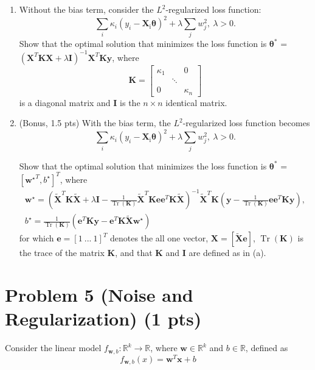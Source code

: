 \documentclass{article}
\DeclareMathOperator{\Tr}{Tr}
\def\matI{{\mathbf I}}
\def\matK{{\mathbf K}}
\begin{document}
\begin{enumerate}[label=(\alph*)]
\item Without the bias term, consider the $L^2$-regularized loss function:
$$\sum_i \kappa_i \left(y_i-\boldsymbol{X}_{\mathrm{i}} \boldsymbol{\theta}\right)^2+\lambda \sum_j w_j^2, \ \lambda > 0.$$
Show that the optimal solution that minimizes the loss function is $\boldsymbol{\theta^*}$ = $\left( \boldsymbol{X}^T \boldsymbol{K} \boldsymbol{X} + \lambda \boldsymbol{I}\right)^{-1} \boldsymbol{X}^T \boldsymbol{K} \boldsymbol{y}$, where
\begin{equation*}
  \boldsymbol{K} =
  \begin{bmatrix}
    \kappa_{1} & & 0\\
    & \ddots & \\
    0 & & \kappa_{n}
  \end{bmatrix}
\end{equation*}
%
is a diagonal matrix and $\boldsymbol{I}$ is the $n \times n$ identical matrix. 
%
\item (Bonus, 1.5 pts) With the bias term, the $L^2$-regularized loss function becomes
$$\sum_i \kappa_i \left(y_i-\boldsymbol{X}_{\mathrm{i}} \boldsymbol{\theta} \right)^2+\lambda \sum_j w_j^2, \ \lambda > 0.$$

Show that the optimal solution that minimizes the loss function is $\boldsymbol{\theta^*} $ =  $[ \boldsymbol{w^{\star}}^T, b^{\star}]^T$, where 
\begin{gather*}
\boldsymbol{w^{\star}}=\left( \boldsymbol{\tilde{X}}^T \boldsymbol{K} \boldsymbol{\tilde{X}} + \lambda \boldsymbol{I} - \frac{1}{\Tr{(\boldsymbol{K})}} \boldsymbol{\tilde{X}}^T \boldsymbol{K} \boldsymbol{e} \boldsymbol{e}^T \boldsymbol{K} \boldsymbol{\tilde{X}} \right)^{-1} \boldsymbol{\tilde{X}}^T \boldsymbol{K} \left( \boldsymbol{y} - \frac{1}{\Tr{(\boldsymbol{K})}} \boldsymbol{e} \boldsymbol{e}^T \boldsymbol{K} \boldsymbol{y} \right),\\
b^{\star} = \frac{1}{\Tr{(\boldsymbol{K})}} \left( \boldsymbol{e}^T \boldsymbol{K} \boldsymbol{y} - \boldsymbol{e}^T \boldsymbol{K} \boldsymbol{\tilde{X}} \boldsymbol{w^{\star}} \right)
\end{gather*}
%
for which $\boldsymbol{e}= [1 \ ... \ 1]^T$ denotes the all one vector, $\boldsymbol{X} = [\boldsymbol{\tilde{X}} \boldsymbol{e}] $, $\Tr{(\boldsymbol{K})}$ is the trace of the matrix $\boldsymbol{K}$, and that $\matK$ and $\matI$ are defined as in (a).
\end{enumerate}

\section*{Problem 5 (Noise and Regularization) (1 pts)}
Consider the linear model $f_{\mathbf{w},b}: \mathbb{R}^k \rightarrow \mathbb{R}$, where $\mathbf{w} \in \mathbb{R}^k$ and $b \in \mathbb{R}$, defined as
$$f_{\mathbf{w},b}(x) = \mathbf{w}^T \mathbf{x} + b$$
\end{document}
